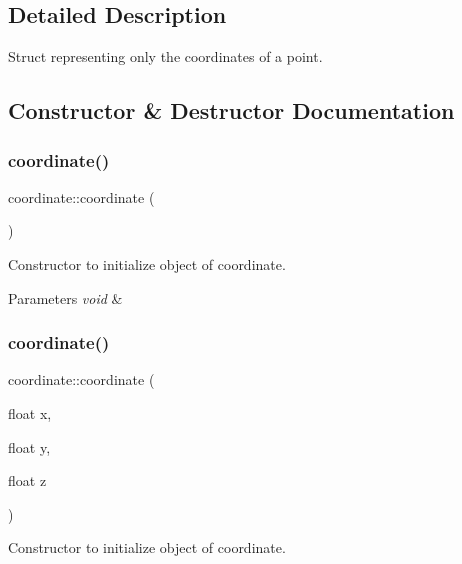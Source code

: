 \subsection{Detailed Description}
Struct representing only the coordinates of a point. 

\subsection{Constructor \& Destructor Documentation}
\mbox{\label{structcoordinate_ad085d510d10555d6e6738ce5f53c8b2e}} 
\subsubsection{\texorpdfstring{coordinate()}{coordinate()}\hspace{0.1cm}{\footnotesize\ttfamily [1/2]}}
{\footnotesize\ttfamily coordinate\+::coordinate (\begin{DoxyParamCaption}{ }\end{DoxyParamCaption})}



Constructor to initialize object of coordinate. 


\begin{DoxyParams}{Parameters}
{\em void} & \\
\hline
\end{DoxyParams}
\mbox{\label{structcoordinate_ac7ea93bbde3bfce755ffb367aae222c3}} 
\subsubsection{\texorpdfstring{coordinate()}{coordinate()}\hspace{0.1cm}{\footnotesize\ttfamily [2/2]}}
{\footnotesize\ttfamily coordinate\+::coordinate (\begin{DoxyParamCaption}\item[{float}]{x,  }\item[{float}]{y,  }\item[{float}]{z }\end{DoxyParamCaption})}



Constructor to initialize object of coordinate. 


